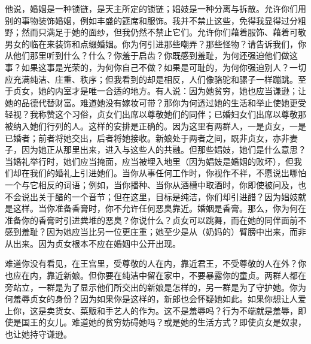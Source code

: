 他说，婚姻是一种锁链，是天主所定的锁链；娼妓是一种分离与拆散。允许你们用别的事物装饰婚姻，例如丰盛的筵席和服饰。我并不禁止这些，免得我显得过分粗野；然而只满足于她的面纱，但我仍然不禁止它们。允许你们藉着服饰、藉着可敬男女的临在来装饰和点缀婚姻。你为何引进那些嘲弄？那些怪物？请告诉我们，你从他们那里听到什么？什么？你羞于启齿？你既感到羞耻，为何还强迫他们做这事？如果这事是光荣的，为何你自己不做？如果是可耻的，为何你强迫别人？一切应充满纯洁、庄重、秩序；但我看到的却是相反，人们像骆驼和骡子一样蹦跳。至于贞女，她的内室才是唯一合适的地方。有人说：因为她贫穷，她也应当谦逊；让她的品德代替财富。难道她没有嫁妆可带？那你为何透过她的生活和举止使她更受轻视？我称赞这个习俗，贞女们出席以尊敬她们的同伴；已婚妇女们出席以尊敬那被纳入她们行列的人。这样的安排是正确的。因为这里有两群人，一是贞女，一是已婚者；前者将她交出，后者将她接收。新娘处于两者之间，既非贞女，亦非妻子，因为她正从那里出来，进入与这些人的共融。但那些娼妓，她们是什么意思？当婚礼举行时，她们应当掩面，应当被埋入地里（因为娼妓是婚姻的败坏），但我们却在我们的婚礼上引进她们。当你从事任何工作时，你视作不祥，不愿说出哪怕一个与它相反的词语；例如，当你播种、当你从酒槽中取酒时，你即使被问及，也不会说出关于醋的一个音节；但在这里，目标是纯洁，你们却引进醋？因为娼妓就是这样。当你准备香膏时，你不允许任何恶臭靠近。婚姻是香膏。那么，你为何在准备你的香膏时引进粪堆的恶臭？你说什么？贞女可以跳舞，而在她的同伴面前不感到羞耻？因为她应当比另一位更庄重；她至少是从（奶妈的）臂膀中出来，而非从出来。因为贞女根本不应在婚姻中公开出现。\par

难道你没有看见，在王宫里，受尊敬的人在内，靠近君王，不受尊敬的人在外？你也应在内，靠近新娘。但你要在纯洁中留在家中，不要暴露你的童贞。两群人都在旁站立，一群是为了显示他们所交出的新娘是怎样的，另一群是为了守护她。你为何羞辱贞女的身份？因为如果你是这样的，新郎也会怀疑她如此。如果你想让人爱上你，这是卖货女、菜贩和手艺人的作为。这不是羞辱吗？行为不端就是羞辱，即使是国王的女儿。难道她的贫穷妨碍她吗？或是她的生活方式？即使贞女是奴隶，也让她持守谦逊。\par

